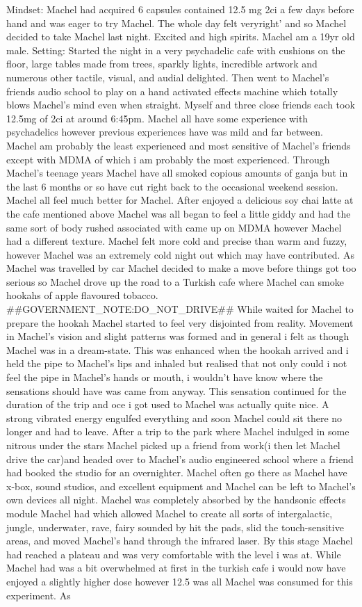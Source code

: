 \documentclass[12pt]{book}
\begin{document}
Mindset: Machel had acquired 6 capsules contained 12.5 mg 2ci a few days before hand and was eager to try Machel. The whole day felt veryright' and so Machel decided to take Machel last night. Excited and high spirits. Machel am a 19yr old male. Setting: Started the night in a very psychadelic cafe with cushions on the floor, large tables made from trees, sparkly lights, incredible artwork and numerous other tactile, visual, and audial delighted. Then went to Machel's friends audio school to play on a hand activated effects machine which totally blows Machel's mind even when straight. Myself and three close friends each took 12.5mg of 2ci at around 6:45pm. Machel all have some experience with psychadelics however previous experiences have was mild and far between. Machel am probably the least experienced and most sensitive of Machel's friends except with MDMA of which i am probably the most experienced. Through Machel's teenage years Machel have all smoked copious amounts of ganja but in the last 6 months or so have cut right back to the occasional weekend session. Machel all feel much better for Machel. After enjoyed a delicious soy chai latte at the cafe mentioned above Machel was all began to feel a little giddy and had the same sort of body rushed associated with came up on MDMA however Machel had a different texture. Machel felt more cold and precise than warm and fuzzy, however Machel was an extremely cold night out which may have contributed. As Machel was travelled by car Machel decided to make a move before things got too serious so Machel drove up the road to a Turkish cafe where Machel can smoke hookahs of apple flavoured tobacco. \#\#GOVERNMENT\_NOTE:DO\_NOT\_DRIVE\#\# While waited for Machel to prepare the hookah Machel started to feel very disjointed from reality. Movement in Machel's vision and slight patterns was formed and in general i felt as though Machel was in a dream-state. This was enhanced when the hookah arrived and i held the pipe to Machel's lips and inhaled but realised that not only could i not feel the pipe in Machel's hands or mouth, i wouldn't have know where the sensations should have was came from anyway. This sensation continued for the duration of the trip and oce i got used to Machel was actually quite nice. A strong vibrated energy engulfed everything and soon Machel could sit there no longer and had to leave. After a trip to the park where Machel indulged in some nitrous under the stars Machel picked up a friend from work(i then let Machel drive the car)and headed over to Machel's audio engineered school where a friend had booked the studio for an overnighter. Machel often go there as Machel have x-box, sound studios, and excellent equipment and Machel can be left to Machel's own devices all night. Machel was completely absorbed by the handsonic effects module Machel had which allowed Machel to create all sorts of intergalactic, jungle, underwater, rave, fairy sounded by hit the pads, slid the touch-sensitive areas, and moved Machel's hand through the infrared laser. By this stage Machel had reached a plateau and was very comfortable with the level i was at. While Machel had was a bit overwhelmed at first in the turkish cafe i would now have enjoyed a slightly higher dose however 12.5 was all Machel was consumed for this experiment. As 
\end{document}
